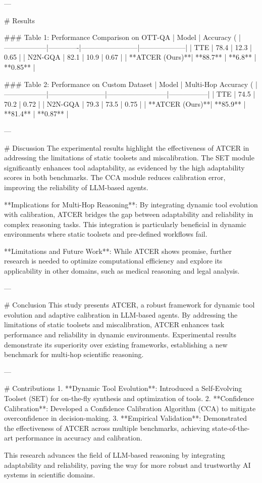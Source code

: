 ---

# Results

### Table 1: Performance Comparison on OTT-QA
| Model           | Accuracy (%
|------------------|-------------|------------------------|--------------------|
| TTE             | 78.4        | 12.3                  | 0.65               |
| N2N-GQA         | 82.1        | 10.9                  | 0.67               |
| **ATCER (Ours)**| **88.7**    | **6.8**               | **0.85**           |

### Table 2: Performance on Custom Dataset
| Model           | Multi-Hop Accuracy (%
|------------------|------------------------|--------------------------|-----------------|
| TTE             | 74.5                  | 70.2                     | 0.72            |
| N2N-GQA         | 79.3                  | 73.5                     | 0.75            |
| **ATCER (Ours)**| **85.9**              | **81.4**                 | **0.87**        |

---

# Discussion
The experimental results highlight the effectiveness of ATCER in addressing the limitations of static toolsets and miscalibration. The SET module significantly enhances tool adaptability, as evidenced by the high adaptability scores in both benchmarks. The CCA module reduces calibration error, improving the reliability of LLM-based agents.

**Implications for Multi-Hop Reasoning**: By integrating dynamic tool evolution with calibration, ATCER bridges the gap between adaptability and reliability in complex reasoning tasks. This integration is particularly beneficial in dynamic environments where static toolsets and pre-defined workflows fail.

**Limitations and Future Work**: While ATCER shows promise, further research is needed to optimize computational efficiency and explore its applicability in other domains, such as medical reasoning and legal analysis.

---

# Conclusion
This study presents ATCER, a robust framework for dynamic tool evolution and adaptive calibration in LLM-based agents. By addressing the limitations of static toolsets and miscalibration, ATCER enhances task performance and reliability in dynamic environments. Experimental results demonstrate its superiority over existing frameworks, establishing a new benchmark for multi-hop scientific reasoning.

---

# Contributions
1. **Dynamic Tool Evolution**: Introduced a Self-Evolving Toolset (SET) for on-the-fly synthesis and optimization of tools.
2. **Confidence Calibration**: Developed a Confidence Calibration Algorithm (CCA) to mitigate overconfidence in decision-making.
3. **Empirical Validation**: Demonstrated the effectiveness of ATCER across multiple benchmarks, achieving state-of-the-art performance in accuracy and calibration.

This research advances the field of LLM-based reasoning by integrating adaptability and reliability, paving the way for more robust and trustworthy AI systems in scientific domains.